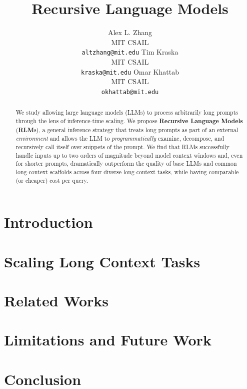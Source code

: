 \documentclass{article} %
\title{Recursive Language Models}
\author{Alex L. Zhang \\
MIT CSAIL \\
\texttt{altzhang@mit.edu}
\And
Tim Kraska \\
MIT CSAIL \\
\texttt{kraska@mit.edu}
\And
Omar Khattab \\
MIT CSAIL \\
\texttt{okhattab@mit.edu}
}
\newcommand{\RLM}{RLM}
\begin{document}
\maketitle

\begin{abstract}

We study allowing large language models (LLMs) to process arbitrarily long prompts through the lens of inference-time scaling. We propose \textbf{Recursive Language Models} (\textbf{RLM}s), a general inference strategy that treats long prompts as part of an external \textit{environment} and allows the LLM to \textit{programmatically} examine, decompose, and recursively call itself over snippets of the prompt. %
We find that \RLM{}s successfully handle inputs up to two orders of magnitude beyond model context windows and, even for shorter prompts, dramatically outperform the quality of base LLMs and common long-context scaffolds across four diverse long-context tasks, while having comparable (or cheaper) cost per query. %







\end{abstract}

\section{Introduction} \label{sec1:introduction}






\section{Scaling Long Context Tasks} \label{sec4:long-input}



\section{Related Works} \label{sec6:related-works}


\section{Limitations and Future Work} \label{sec7:limitations-future}


\section{Conclusion} \label{sec7:conclusion}

\end{document}
